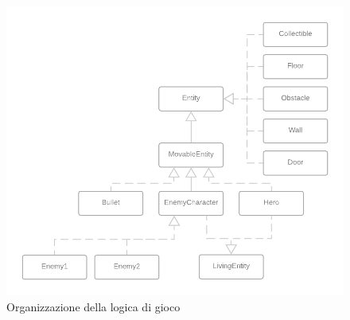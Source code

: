 \begin{figure}[H]
  \includegraphics[width=14cm]{res/GAMELOGIC_Diagram.png}
  \caption{Organizzazione della logica di gioco}
  \label{model}
\end{figure}